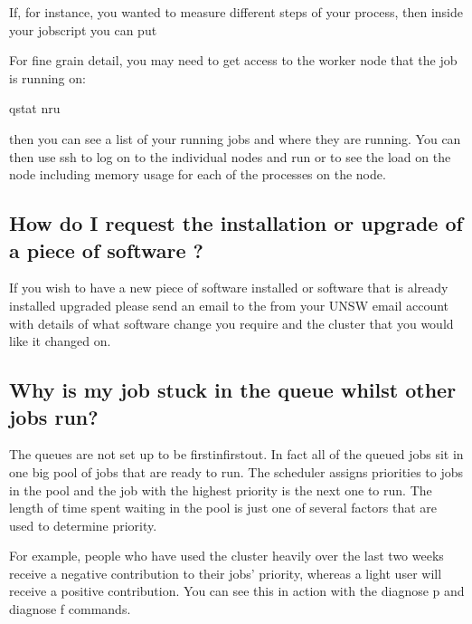 \documentclass[letterpaper,10pt,english]{sphinxmanual}
\begin{document}
If, for instance, you wanted to measure different steps of your process, then inside your jobscript you can put 

For fine grain detail, you may need to get access to the worker node that the job is running on:

\begin{sphinxVerbatim}[commandchars=\\\{\}]
qstat \PYGZhy{}nru 
\end{sphinxVerbatim}

then you can see a list of your running jobs and where they are running. You can then use ssh to log on to the individual nodes and run  or  to see the load on the node including memory usage for each of the processes on the node.


\subsection{How do I request the installation or upgrade of a piece of software ?}
\label{\detokenize{faq:how-do-i-request-the-installation-or-upgrade-of-a-piece-of-software}}
If you wish to have a new piece of software installed or software that is already installed upgraded please send an email to the  from your UNSW email account with details of what software change you require and the cluster that you would like it changed on.


\subsection{Why is my job stuck in the queue whilst other jobs run?}
\label{\detokenize{faq:why-is-my-job-stuck-in-the-queue-whilst-other-jobs-run}}
The queues are not set up to be first\sphinxhyphen{}in\sphinxhyphen{}first\sphinxhyphen{}out. In fact all of the queued jobs sit in one big pool of jobs that are ready to run. The scheduler assigns priorities to jobs in the pool and the job with the highest priority is the next one to run. The length of time spent waiting in the pool is just one of several factors that are used to determine priority.

For example, people who have used the cluster heavily over the last two weeks receive a negative contribution to their jobs’ priority, whereas a light user will receive a positive contribution. You can see this in action with the diagnose \sphinxhyphen{}p and diagnose \sphinxhyphen{}f commands.
\end{document}
